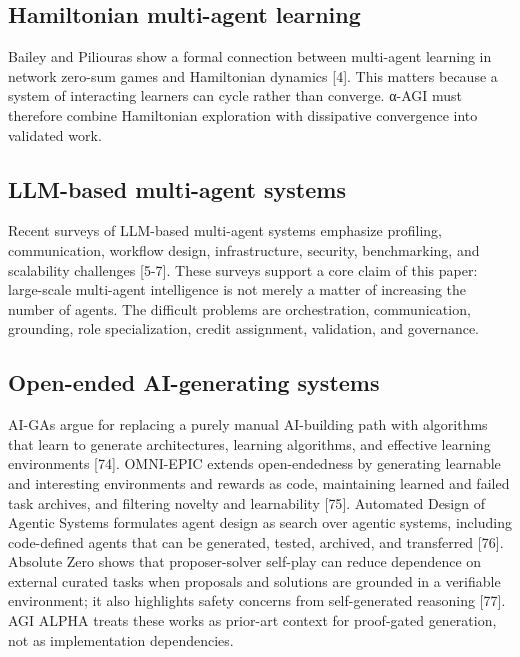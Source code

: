 \documentclass[
  11pt,
]{article}
\begin{document}
\subsection{Hamiltonian multi-agent
learning}\label{hamiltonian-multi-agent-learning}

Bailey and Piliouras show a formal connection between multi-agent
learning in network zero-sum games and Hamiltonian dynamics {[}4{]}.
This matters because a system of interacting learners can cycle rather
than converge. α-AGI must therefore combine Hamiltonian exploration with
dissipative convergence into validated work.

\subsection{LLM-based multi-agent
systems}\label{llm-based-multi-agent-systems}

Recent surveys of LLM-based multi-agent systems emphasize profiling,
communication, workflow design, infrastructure, security, benchmarking,
and scalability challenges {[}5-7{]}. These surveys support a core claim
of this paper: large-scale multi-agent intelligence is not merely a
matter of increasing the number of agents. The difficult problems are
orchestration, communication, grounding, role specialization, credit
assignment, validation, and governance.

\subsection{Open-ended AI-generating
systems}\label{open-ended-ai-generating-systems}

AI-GAs argue for replacing a purely manual AI-building path with
algorithms that learn to generate architectures, learning algorithms,
and effective learning environments {[}74{]}. OMNI-EPIC extends
open-endedness by generating learnable and interesting environments and
rewards as code, maintaining learned and failed task archives, and
filtering novelty and learnability {[}75{]}. Automated Design of Agentic
Systems formulates agent design as search over agentic systems,
including code-defined agents that can be generated, tested, archived,
and transferred {[}76{]}. Absolute Zero shows that proposer-solver
self-play can reduce dependence on external curated tasks when proposals
and solutions are grounded in a verifiable environment; it also
highlights safety concerns from self-generated reasoning {[}77{]}. AGI
ALPHA treats these works as prior-art context for proof-gated
generation, not as implementation dependencies.
\end{document}
